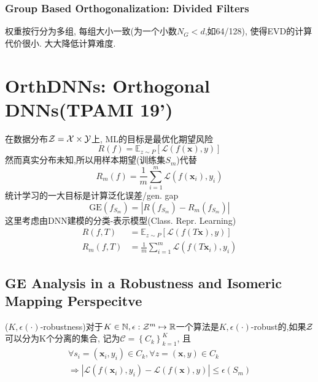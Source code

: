 \documentclass{article}
\begin{document}
\subsubsection{Group Based Orthogonalization: Divided Filters}

\flushleft
权重按行分为多组, 每组大小一致(为一个小数$N_G<d$,如64/128), 使得EVD的计算代价很小. 大大降低计算难度.

\section{OrthDNNs: Orthogonal DNNs(TPAMI 19')}

在数据分布$\cal Z=\cal X\times \cal Y$上, ML的目标是最优化期望风险
\begin{equation}
    R(f)=\mathbb{E}_{z \sim P}[\mathcal{L}(f(\boldsymbol{x}), y)]
\end{equation}
然而真实分布未知,所以用样本期望(训练集$S_m$)代替
\begin{equation}
    R_{m}(f)=\frac{1}{m} \sum_{i=1}^{m} \mathcal{L}\left(f\left(\boldsymbol{x}_{i}\right), y_{i}\right)
\end{equation}
统计学习的一大目标是计算泛化误差/gen. gap
\begin{equation}
    \mathrm{GE}\left(f_{S_{m}}\right)=\left|R\left(f_{S_{m}}\right)-R_{m}\left(f_{S_{m}}\right)\right|
\end{equation}
这里考虑由DNN建模的分类-表示模型(Class. Repr. Learning)
\begin{equation}
    \begin{aligned}
    R(f, T) &=\mathbb{E}_{z \sim P}[\mathcal{L}(f(T \boldsymbol{x}), y)] \\
    R_{m}(f, T) &=\frac{1}{m} \sum_{i=1}^{m} \mathcal{L}\left(f\left(T \boldsymbol{x}_{i}\right), y_{i}\right)
    \end{aligned}
\end{equation}

\subsection{GE Analysis in a Robustness and Isomeric Mapping Perspecitve}

\begin{definition}
    ($K,\epsilon(\cdot)$-robustness)对于$K\in \mathbb{N},\epsilon: \cal{Z}^m\mapsto \R$一个算法是$K,\epsilon(\cdot)$-robust的,如果$\cal Z$可以分为K个分离的集合, 记为$\mathcal{C}=\left\{C_{k}\right\}_{k=1}^{K}$, 且
    \begin{equation}
        \begin{array}{r}
        \forall s_{i}=\left(\boldsymbol{x}_{i}, y_{i}\right) \in C_{k}, \forall z=(\boldsymbol{x}, y) \in C_{k} \\
        \Longrightarrow\left|\mathcal{L}\left(f\left(\boldsymbol{x}_{i}\right), y_{i}\right)-\mathcal{L}(f(\boldsymbol{x}), y)\right| \leq \epsilon\left(S_{m}\right)
        \end{array}
    \end{equation}
\end{definition}
\end{document}
